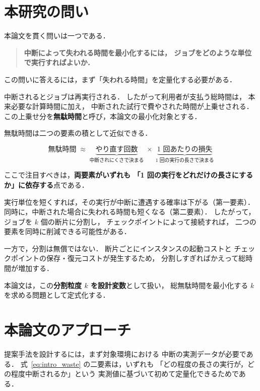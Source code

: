 \documentclass[11pt,a4paper]{ltjsreport}
\begin{document}
\section{本研究の問い}
\label{sec:question}

本論文を貫く問いは一つである．

\begin{quote}
\textbf{中断によって失われる時間を最小化するには，
ジョブをどのような単位で実行すればよいか．}
\end{quote}

この問いに答えるには，まず「失われる時間」を定量化する必要がある．

中断されるとジョブは再実行される．
したがって利用者が支払う総時間は，
本来必要な計算時間に加え，
中断された試行で費やされた時間が上乗せされる．
この上乗せ分を\textbf{無駄時間}と呼び，本論文の最小化対象とする．

無駄時間は二つの要素の積として近似できる．

\begin{equation}
\text{無駄時間} \;\approx\;
\underbrace{\text{やり直す回数}}_{\text{中断されにくさで決まる}}
\;\times\;
\underbrace{\text{1 回あたりの損失}}_{\text{1 回の実行の長さで決まる}}
\label{eq:intro_waste}
\end{equation}

ここで注目すべきは，\textbf{両要素がいずれも
「1 回の実行をどれだけの長さにするか」に依存する}点である．

実行単位を短くすれば，その実行が中断に遭遇する確率は下がる（第一要素）．
同時に，中断された場合に失われる時間も短くなる（第二要素）．
したがって，ジョブを $k$ 個の断片に分割し，
チェックポイントによって接続すれば，
二つの要素を同時に削減できる可能性がある．

一方で，分割は無償ではない．
断片ごとにインスタンスの起動コストと
チェックポイントの保存・復元コストが発生するため，
分割しすぎればかえって総時間が増加する．

本論文は，この\textbf{分割粒度 $k$ を設計変数}として扱い，
総無駄時間を最小化する $k$ を求める問題として定式化する．

\section{本論文のアプローチ}

提案手法を設計するには，まず対象環境における
中断の実測データが必要である．
式~\eqref{eq:intro_waste} の二要素は，いずれも
「どの程度の長さの実行が，どの程度中断されるか」という
実測値に基づいて初めて定量化できるためである．
\end{document}

